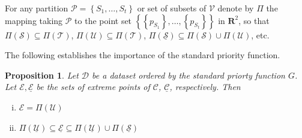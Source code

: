 \documentclass{article}
\newtheorem{prop}{Proposition}
\theoremstyle{case}
\begin{document}
For any partition $\mathcal{P} = \left\lbrace S_1, \dots, S_t\right\rbrace$ or set of subsets of $\mathcal{V}$ denote by $\Pi$ the mapping taking $\mathcal{P}$ to the point set $\left\lbrace \left\lbrace p_{S_1}\right\rbrace, \dots, \left\lbrace p_{S_t}\right\rbrace \right\rbrace$ in $\mathbf{R}^2$, so that $\Pi\left( \mathcal{S}\right) \subseteq \Pi\left( \mathcal{T}\right)$, $\Pi\left( \mathcal{U}\right) \subseteq \Pi\left( \mathcal{T}\right)$, $\Pi\left( \mathcal{\underline{S}}\right) \subseteq \Pi\left( \mathcal{S}\right) \cup \Pi\left( \mathcal{U}\right)$, etc.


The following establishes the importance of the standard priority function.

\begin{prop} \label{prop0}
Let $\mathcal{D}$ be a dataset ordered by the standard priorty function $G$. Let $\mathcal{E}, \underline{\mathcal{E}}$ be the sets of extreme points of $\mathcal{C}$, $\underline{\mathcal{C}}$, respectively. Then
\begin{enumerate}[(i)]
	\item $\mathcal{E} = \Pi\left( \mathcal{U}\right)$
	\item $\Pi\left( \mathcal{\underline{U}}\right) \subseteq \underline{\mathcal{E}} \subseteq \Pi\left( \mathcal{\underline{U}}\right) \cup \Pi\left( \mathcal{\underline{S}}\right)$
\end{enumerate}
\end{prop}
\end{document}
